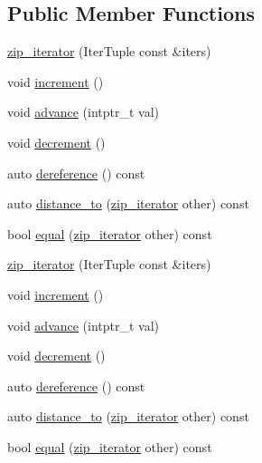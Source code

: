 \subsection*{Public Member Functions}
\begin{DoxyCompactItemize}
\item 
\mbox{\hyperlink{structrah_1_1view_1_1zip__iterator_a2f6b7c790bcb819a68e4828f6bd6ef79}{zip\+\_\+iterator}} (Iter\+Tuple const \&iters)
\item 
void \mbox{\hyperlink{structrah_1_1view_1_1zip__iterator_a156b181d725c31af3c34180806d6428e}{increment}} ()
\item 
void \mbox{\hyperlink{structrah_1_1view_1_1zip__iterator_abc9b6f7ff787d1a08c4a327d738a1809}{advance}} (intptr\+\_\+t val)
\item 
void \mbox{\hyperlink{structrah_1_1view_1_1zip__iterator_a5618c02a5596c1306d1abc0b1413f086}{decrement}} ()
\item 
auto \mbox{\hyperlink{structrah_1_1view_1_1zip__iterator_a775ecbdf57e02dd926e5b83f0a3bd8c1}{dereference}} () const
\item 
auto \mbox{\hyperlink{structrah_1_1view_1_1zip__iterator_a01c298bede994df318d47205c50cc461}{distance\+\_\+to}} (\mbox{\hyperlink{structrah_1_1view_1_1zip__iterator}{zip\+\_\+iterator}} other) const
\item 
bool \mbox{\hyperlink{structrah_1_1view_1_1zip__iterator_ab8712d7266cdc63143e61841fa371179}{equal}} (\mbox{\hyperlink{structrah_1_1view_1_1zip__iterator}{zip\+\_\+iterator}} other) const
\item 
\mbox{\hyperlink{structrah_1_1view_1_1zip__iterator_a2f6b7c790bcb819a68e4828f6bd6ef79}{zip\+\_\+iterator}} (Iter\+Tuple const \&iters)
\item 
void \mbox{\hyperlink{structrah_1_1view_1_1zip__iterator_a156b181d725c31af3c34180806d6428e}{increment}} ()
\item 
void \mbox{\hyperlink{structrah_1_1view_1_1zip__iterator_abc9b6f7ff787d1a08c4a327d738a1809}{advance}} (intptr\+\_\+t val)
\item 
void \mbox{\hyperlink{structrah_1_1view_1_1zip__iterator_a5618c02a5596c1306d1abc0b1413f086}{decrement}} ()
\item 
auto \mbox{\hyperlink{structrah_1_1view_1_1zip__iterator_a775ecbdf57e02dd926e5b83f0a3bd8c1}{dereference}} () const
\item 
auto \mbox{\hyperlink{structrah_1_1view_1_1zip__iterator_a01c298bede994df318d47205c50cc461}{distance\+\_\+to}} (\mbox{\hyperlink{structrah_1_1view_1_1zip__iterator}{zip\+\_\+iterator}} other) const
\item 
bool \mbox{\hyperlink{structrah_1_1view_1_1zip__iterator_ab8712d7266cdc63143e61841fa371179}{equal}} (\mbox{\hyperlink{structrah_1_1view_1_1zip__iterator}{zip\+\_\+iterator}} other) const
\end{DoxyCompactItemize}
